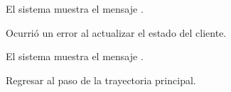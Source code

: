 {\begin{trayectoriaAlternativa}
    \item El sistema muestra el mensaje
      .

  \end{trayectoriaAlternativa}

  \begin{trayectoriaAlternativa}
    {Ocurrió un error al actualizar el estado del cliente.}

    \item El sistema muestra el mensaje
      .

    \item Regresar al paso  de la
      trayectoria principal.

  \end{trayectoriaAlternativa}
}
